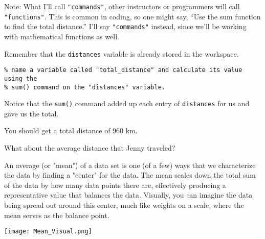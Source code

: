 \documentclass{ximera}
\begin{document}
\begin{remark}
Note: What I'll call \texttt{"commands"}, other instructors or programmers will call \texttt{"functions"}. This is common in coding, so one might say, “Use the sum function to find the total distance.” I'll say \texttt{"commands"} instead, since we'll be working with mathematical functions as well.
\end{remark}

Remember that the \texttt{distances} variable is already stored in the workspace.

\begin{verbatim}
% name a variable called "total_distance" and calculate its value using the
% sum() command on the "distances" variable.
\end{verbatim}

Notice that the \texttt{sum()} command added up each entry of \texttt{distances} for us and gave us the total.

You should get a total distance of 960 km.

What about the average distance that Jenny traveled?

An average (or "mean") of a data set is one (of a few) ways that we characterize the data by finding a "center" for the data. The mean scales down the total sum of the data by how many data points there are, effectively producing a representative value that balances the data. Visually, you can imagine the data being spread out around this center, much like weights on a scale, where the mean serves as the balance point.

\begin{center}
\texttt{[image: Mean\_Visual.png]}
\end{center}
\end{document}
